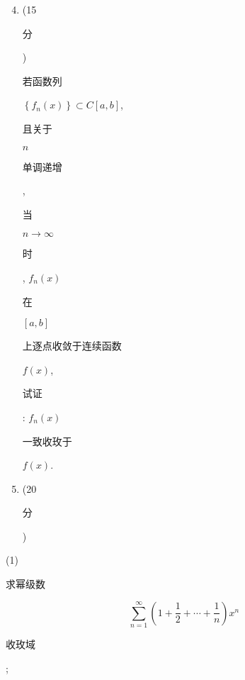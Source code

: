 \documentclass[10pt]{article}
\begin{document}
\begin{enumerate}
  \setcounter{enumi}{3}
  \item (15 \begin{CJK}{UTF8}{mj}分\end{CJK}) \begin{CJK}{UTF8}{mj}若函数列\end{CJK} $\left\{f_{n}(x)\right\} \subset C[a, b]$, \begin{CJK}{UTF8}{mj}且关于\end{CJK} $n$ \begin{CJK}{UTF8}{mj}单调递增\end{CJK}, \begin{CJK}{UTF8}{mj}当\end{CJK} $n \rightarrow \infty$ \begin{CJK}{UTF8}{mj}时\end{CJK}, $f_{n}(x)$ \begin{CJK}{UTF8}{mj}在\end{CJK} $[a, b]$ \begin{CJK}{UTF8}{mj}上逐点收敛于连续函数\end{CJK} $f(x)$, \begin{CJK}{UTF8}{mj}试证\end{CJK}: $f_{n}(x)$ \begin{CJK}{UTF8}{mj}一致收玫于\end{CJK} $f(x)$.

  \item (20 \begin{CJK}{UTF8}{mj}分\end{CJK})

\end{enumerate}
(1) \begin{CJK}{UTF8}{mj}求幂级数\end{CJK}
$$
\sum_{n=1}^{\infty}\left(1+\frac{1}{2}+\cdots+\frac{1}{n}\right) x^{n}
$$
\begin{CJK}{UTF8}{mj}收玫域\end{CJK};
\end{document}
